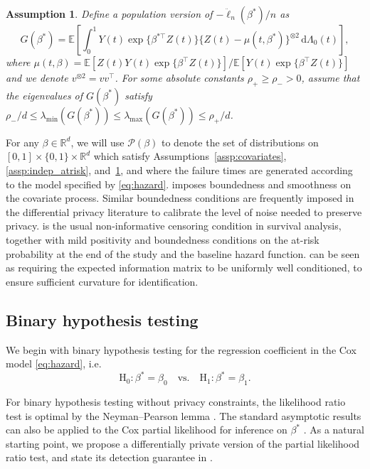 \documentclass[11pt]{article}
\newtheorem{assumption}{Assumption}
\newcommand{\dint}{\,\mathrm{d}}
\begin{document}
\begin{assumption}\label{assp:eigenvalue} Define a population version of $-\ddot{\ell}_n(\beta^*)/n$ as 
\begin{equation} \label{eq-G-def}
G(\beta^*) = \mathbb{E} \left[ \int_0^1 Y(t) \exp\{\beta^{*\top} Z(t)\}\{Z(t) - \mu(t, \beta^*)\}^{\otimes 2} \dint \Lambda_0(t) \right], 
\end{equation}
where $\mu(t, \beta) = \mathbb{E}[Z(t) Y(t) \exp\{\beta^\top Z(t)\}]/\mathbb{E}[Y(t) \exp\{\beta^\top Z(t)\}]$ and we denote $v^{\otimes 2} = vv^\top$.  For some absolute constants $\rho_+ \geq \rho_- > 0$, assume that the eigenvalues of $G(\beta^*)$ satisfy $\rho_-/d \leq \lambda_{\min}(G(\beta^*)) \leq \lambda_{\max}(G(\beta^*)) \leq \rho_+/d$. 
\end{assumption}
For any $\beta \in \mathbb{R}^d$, we will use $\mathcal{P}(\beta)$ to denote the set of distributions on $[0, 1] \times \{0, 1\} \times \mathbb{R}^d$ which satisfy Assumptions~\ref{assp:covariates}, \ref{assp:indep_atrisk}, and~\ref{assp:eigenvalue}, and where the failure times are generated according to the model specified by \eqref{eq:hazard}.  
 imposes boundedness and smoothness on the covariate process. Similar boundedness conditions are frequently imposed in the differential privacy literature to calibrate the level of noise needed to preserve privacy.   is the usual non-informative censoring condition in survival analysis, together with mild positivity and boundedness conditions on the at-risk probability at the end of the study and the baseline hazard function.  can be seen as requiring the expected information matrix to be uniformly well conditioned, to ensure sufficient curvature for identification. 

 

\subsection{Binary hypothesis testing}
\label{sec-2}
We begin with binary hypothesis testing for the regression coefficient in the Cox model \eqref{eq:hazard}, i.e.
\begin{equation}
        \mathrm{H}_0: \beta^* = \beta_0 \quad \mbox{vs.} \quad \mathrm{H}_1: \beta^* = \beta_1.
        \label{eq:binary_test_def}
\end{equation}


For binary hypothesis testing without privacy constraints, the likelihood ratio test is optimal by the Neyman--Pearson lemma \citep[e.g.][Theorem 8.3.12]{casella2024statistical}. The standard asymptotic results can also be applied to the Cox partial likelihood for inference on $\beta^*$ \citep{therneau2000cox}. As a natural starting point, we propose a differentially private version of the partial likelihood ratio test, and state its detection guarantee in .
\end{document}
